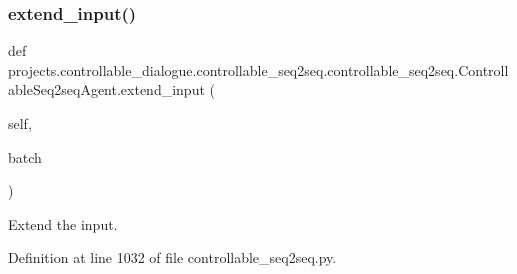 \subsubsection{\texorpdfstring{extend\+\_\+input()}{extend\_input()}}
{\footnotesize\ttfamily def projects.\+controllable\+\_\+dialogue.\+controllable\+\_\+seq2seq.\+controllable\+\_\+seq2seq.\+Controllable\+Seq2seq\+Agent.\+extend\+\_\+input (\begin{DoxyParamCaption}\item[{}]{self,  }\item[{}]{batch }\end{DoxyParamCaption})}

\begin{DoxyVerb}Extend the input.
\end{DoxyVerb}
 

Definition at line 1032 of file controllable\+\_\+seq2seq.\+py.


